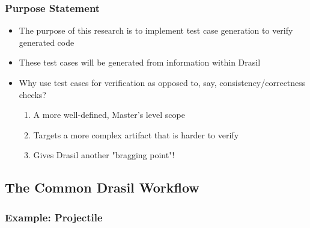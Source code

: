\documentclass{beamer}
\begin{document}
\begin{frame}
    \frametitle{Purpose Statement}
    \begin{itemize}
        \item The purpose of this research is to implement test case generation
              to verify generated code
        \item These test cases will be generated from information within Drasil
        \item<2-> Why use test cases for verification as opposed to, say,
              consistency/correctness checks?
              \begin{enumerate}
                  \item<3-> A more well-defined, Master's level scope
                  \item<4-> Targets a more complex artifact that is harder to verify
                  \item<5-> Gives Drasil another "bragging point"!
              \end{enumerate}
    \end{itemize}
\end{frame}


\subsection{The Common Drasil Workflow}
\subsubsection*{Example: Projectile}
\end{document}

